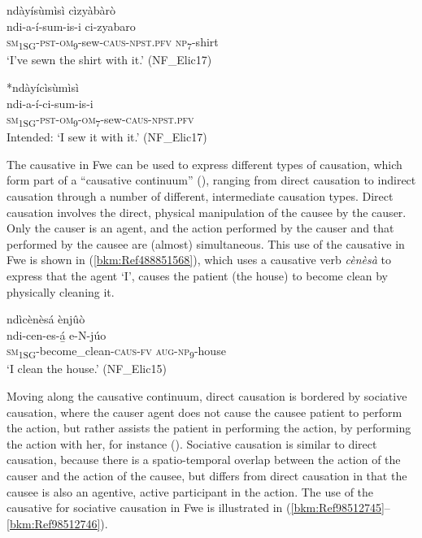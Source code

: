 \ea
\label{bkm:Ref75169044}
ndàyísùmìsì cìzyàbàrò\\
\gll ndi-a-í-sum-is-i        ci-zyabaro\\
\textsc{sm}\textsubscript{1SG}-\textsc{pst}-\textsc{om}\textsubscript{9}-sew-\textsc{caus}-\textsc{npst}.\textsc{pfv}  \textsc{np}\textsubscript{7}-shirt\\
\glt ‘I’ve sewn the shirt with it.’ (NF\_Elic17)
\z

\ea
\label{bkm:Ref75169061}
*ndàyícìsùmìsì\\
ndi-a-í-ci-sum-is-i\\
\textsc{sm}\textsubscript{1SG}-\textsc{pst}-\textsc{om}\textsubscript{9}-\textsc{om}\textsubscript{7}-sew-\textsc{caus}-\textsc{npst}.\textsc{pfv}\\
Intended: ‘I sew it with it.’ (NF\_Elic17)
\z

The causative in Fwe can be used to express different types of causation, which form part of a “causative continuum” (\citealt{ShibataniPardeshi2001}), ranging from direct causation to indirect causation through a number of different, intermediate causation types. Direct causation involves the direct, physical manipulation of the causee by the causer. Only the causer is an agent, and the action performed by the causer and that performed by the causee are (almost) simultaneous. This use of the causative in Fwe is shown in (\ref{bkm:Ref488851568}), which uses a causative verb \textit{cènèsà} to express that the agent ‘I’, causes the patient (the house) to become clean by physically cleaning it.

\ea
\label{bkm:Ref488851568}
ndìcènèsá ènjûò\\
\gll ndi-cen-es-á̲        e-N-júo\\
\textsc{sm}\textsubscript{1SG}-become\_clean-\textsc{caus}-\textsc{fv}  \textsc{aug}-\textsc{np}\textsubscript{9}-house\\
\glt ‘I clean the house.’ (NF\_Elic15)
\z

Moving along the causative continuum, direct causation is bordered by sociative causation, where the causer agent does not cause the causee patient to perform the action, but rather assists the patient in performing the action, by performing the action with her, for instance (\citealt{ShibataniPardeshi2001}). Sociative causation is similar to direct causation, because there is a spatio-temporal overlap between the action of the causer and the action of the causee, but differs from direct causation in that the causee is also an agentive, active participant in the action. The use of the causative for sociative causation in Fwe is illustrated in (\ref{bkm:Ref98512745}--\ref{bkm:Ref98512746}).

